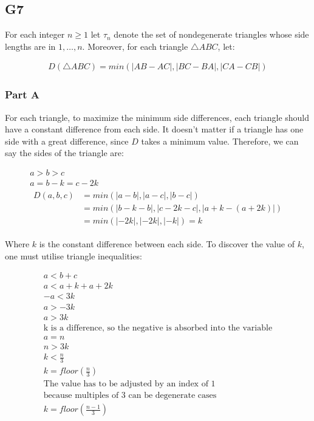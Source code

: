 \subsection*{G7}

For each integer $n \geq 1$ let $\tau_n$ denote the set of nondegenerate triangles whose side lengths are in ${1, \dots , n}$. Moreover, for each triangle $\triangle{ABC}$, let:

\begin{gather} \label{eq:g7}
    D(\triangle{ABC}) = min(|AB - AC|, |BC - BA|, |CA - CB|)
\end{gather}

\subsubsection*{Part A}

For each triangle, to maximize the minimum side differences, each triangle should have a constant difference from each side. It doesn't matter if a triangle has one side with a great difference, since $D$ takes a minimum value. Therefore, we can say the sides of the triangle are:

\begin{gather} \label{eq:triangle_equalities}
    a > b > c \\
    a = b - k = c - 2k \\
    \begin{align}
        D(a, b, c) &= min(|a-b|, |a-c|, |b-c|) \\
        &= min(|b-k-b|, |c-2k-c|, |a+k-(a+2k)|)  \\
        &= min(|-2k|, |-2k|, |-k|) = k
    \end{align}
\end{gather}

Where $k$ is the constant difference between each side. To discover the value of $k$, one must utilise triangle inequalities:

\begin{gather} \label{eq:triangle_inequalities}
    a < b + c \\
    a < a + k + a + 2k \\
    -a < 3k \\
    a > -3k \\
    a > 3k \\
    \text{k is a difference, so the negative is absorbed into the variable} \\
    a = n \\
    n > 3k \\
    k < \frac{n}{3} \\
    k = floor\left(\frac{n}{3}\right) \\
    \text{The value has to be adjusted by an index of $1$} \\
    \text{because multiples of 3 can be degenerate cases} \\
    k = floor\left(\frac{n-1}{3}\right) \\
\end{gather}

